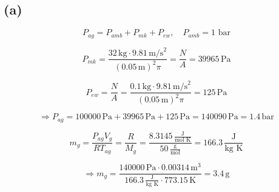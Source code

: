 

\subsection*{(a)}

\[
P_{ag} = P_{amb} + P_{mk} + P_{ew}, \quad P_{amb} = 1 \text{ bar}
\]

\[
P_{mk} = \frac{32 \, \text{kg} \cdot 9.81 \, \text{m/s}^2}{(0.05 \, \text{m})^2 \pi} = \frac{N}{A} = 39965 \, \text{Pa}
\]

\[
P_{ew} = \frac{N}{A} = \frac{0.1 \, \text{kg} \cdot 9.81 \, \text{m/s}^2}{(0.05 \, \text{m})^2 \pi} = 125 \, \text{Pa}
\]

\[
\Rightarrow P_{ag} = 100000 \, \text{Pa} + 39965 \, \text{Pa} + 125 \, \text{Pa} = 140090 \, \text{Pa} = 1.4 \, \text{bar}
\]

\[
m_g = \frac{P_{ag} V_g}{R T_{ag}} = \frac{R}{M_g} = \frac{8.3145 \, \frac{\text{J}}{\text{mol K}}}{50 \, \frac{\text{g}}{\text{mol}}} = 166.3 \, \frac{\text{J}}{\text{kg K}}
\]

\[
\Rightarrow m_g = \frac{140000 \, \text{Pa} \cdot 0.00314 \, \text{m}^3}{166.3 \, \frac{\text{J}}{\text{kg K}} \cdot 773.15 \, \text{K}} = 3.4 \, \text{g}
\]
